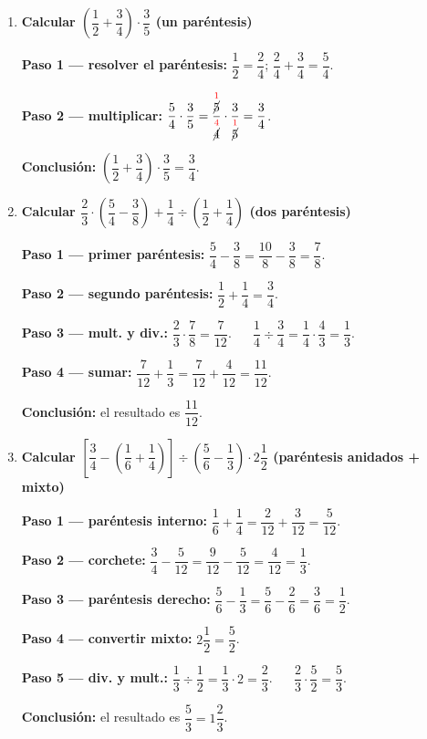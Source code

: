 \documentclass[11pt, letterpaper]{article}
\begin{document}
\begin{tcolorbox}[examplebox, title={Ejemplos con s\'imbolos de agrupaci\'on}]
\begin{enumerate}[label=\textbf{Ej. \arabic*.}, leftmargin=*, itemsep=16pt]

\item \textbf{Calcular $\left(\dfrac{1}{2}+\dfrac{3}{4}\right)\cdot\dfrac{3}{5}$ (un par\'entesis)}

\textbf{Paso 1 --- resolver el par\'entesis:}
$\dfrac{1}{2}=\dfrac{2}{4}$; $\dfrac{2}{4}+\dfrac{3}{4}=\dfrac{5}{4}$.

\medskip
\textbf{Paso 2 --- multiplicar:}
$\dfrac{5}{4}\cdot\dfrac{3}{5}=\dfrac{\overset{\textcolor{red}{1}}{\cancel{5}}}{\overset{\textcolor{red}{4}}{\cancel{4}}}\cdot\dfrac{3}{\overset{\textcolor{red}{1}}{\cancel{5}}}=\dfrac{3}{4}$.

\medskip
\textbf{Conclusi\'on:} $\left(\dfrac{1}{2}+\dfrac{3}{4}\right)\cdot\dfrac{3}{5}=\dfrac{3}{4}$.

\item \textbf{Calcular $\dfrac{2}{3}\cdot\left(\dfrac{5}{4}-\dfrac{3}{8}\right)+\dfrac{1}{4}\div\left(\dfrac{1}{2}+\dfrac{1}{4}\right)$ (dos par\'entesis)}

\textbf{Paso 1 --- primer par\'entesis:} $\dfrac{5}{4}-\dfrac{3}{8}=\dfrac{10}{8}-\dfrac{3}{8}=\dfrac{7}{8}$.

\medskip
\textbf{Paso 2 --- segundo par\'entesis:} $\dfrac{1}{2}+\dfrac{1}{4}=\dfrac{3}{4}$.

\medskip
\textbf{Paso 3 --- mult. y div.:}
$\dfrac{2}{3}\cdot\dfrac{7}{8}=\dfrac{7}{12}$. $\quad$ $\dfrac{1}{4}\div\dfrac{3}{4}=\dfrac{1}{4}\cdot\dfrac{4}{3}=\dfrac{1}{3}$.

\medskip
\textbf{Paso 4 --- sumar:}
$\dfrac{7}{12}+\dfrac{1}{3}=\dfrac{7}{12}+\dfrac{4}{12}=\dfrac{11}{12}$.

\medskip
\textbf{Conclusi\'on:} el resultado es $\dfrac{11}{12}$.

\item \textbf{Calcular $\left[\dfrac{3}{4}-\left(\dfrac{1}{6}+\dfrac{1}{4}\right)\right]\div\left(\dfrac{5}{6}-\dfrac{1}{3}\right)\cdot 2\dfrac{1}{2}$ (par\'entesis anidados + mixto)}

\textbf{Paso 1 --- par\'entesis interno:} $\dfrac{1}{6}+\dfrac{1}{4}=\dfrac{2}{12}+\dfrac{3}{12}=\dfrac{5}{12}$.

\medskip
\textbf{Paso 2 --- corchete:} $\dfrac{3}{4}-\dfrac{5}{12}=\dfrac{9}{12}-\dfrac{5}{12}=\dfrac{4}{12}=\dfrac{1}{3}$.

\medskip
\textbf{Paso 3 --- par\'entesis derecho:} $\dfrac{5}{6}-\dfrac{1}{3}=\dfrac{5}{6}-\dfrac{2}{6}=\dfrac{3}{6}=\dfrac{1}{2}$.

\medskip
\textbf{Paso 4 --- convertir mixto:} $2\dfrac{1}{2}=\dfrac{5}{2}$.

\medskip
\textbf{Paso 5 --- div. y mult.:}
$\dfrac{1}{3}\div\dfrac{1}{2}=\dfrac{1}{3}\cdot2=\dfrac{2}{3}$. $\quad$ $\dfrac{2}{3}\cdot\dfrac{5}{2}=\dfrac{5}{3}$.

\medskip
\textbf{Conclusi\'on:} el resultado es $\dfrac{5}{3}=1\dfrac{2}{3}$.

\end{enumerate}
\end{tcolorbox}
\end{document}
